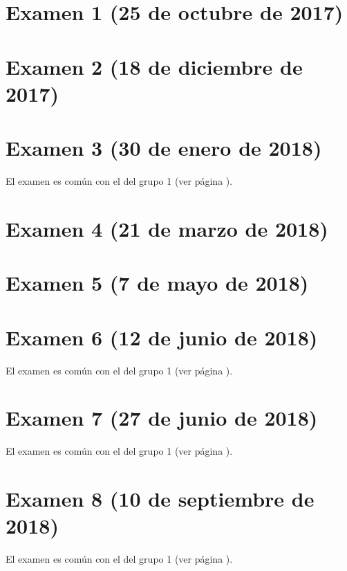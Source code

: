 \documentclass[a4paper,12pt,twoside]{book}
\begin{document}
\section{Examen 1 (25 de octubre de 2017)}
\section{Examen 2 (18 de diciembre de 2017)}
\section{Examen 3 (30 de enero de 2018)}
El examen es común con el del grupo 1 (ver página \pageref{examen_17_18_1_3}).
\section{Examen 4 (21 de marzo de 2018)}
\section{Examen 5 (7 de mayo de 2018)}
\section{Examen 6 (12 de junio de 2018)}
El examen es común con el del grupo 1 (ver página \pageref{examen_17_18_1_6}).
\section{Examen 7 (27 de junio de 2018)}
El examen es común con el del grupo 1 (ver página \pageref{examen_17_18_1_7}).
\section{Examen 8 (10 de septiembre de 2018)}
El examen es común con el del grupo 1 (ver página \pageref{examen_17_18_1_8}).

\appendix %






\nocite{Alonso-12b}
\nocite{Bird-99a}
\nocite{Cunningham-10a}
\nocite{Daume-06}
\nocite{Davie-92a}
\nocite{Doets-04a}
\nocite{Fokker-96}
\nocite{Hudak-00a}
\nocite{Hudak-12a}
\nocite{Hutton-07a}
\nocite{OSullivan-08a}
\nocite{Rabhi-99a}
\nocite{Polya-65a}
\nocite{Ruiz-04}
\nocite{Thompson-11a}



\end{document}
